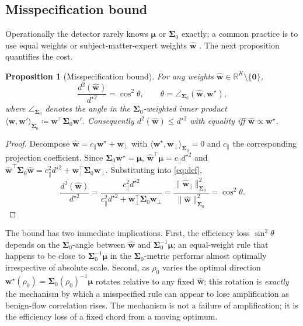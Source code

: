 \documentclass[11pt,a4paper]{article}
\newtheorem{proposition}[theorem]{Proposition}
\theoremstyle{definition}
\theoremstyle{remark}
\newcommand{\R}{\mathbb{R}}
\newcommand{\1}{\mathbf{1}}
\newcommand{\w}{\mathbf{w}}
\newcommand{\mmu}{\boldsymbol{\mu}}
\newcommand{\Sig}{\boldsymbol{\Sigma}}
\newcommand{\trans}{^{\!\top}}
\newcommand{\defeq}{\coloneqq}
\begin{document}
\subsection{Misspecification bound}
Operationally the detector rarely knows $\mmu$ or $\Sig_0$ exactly; a common practice is to use equal weights or subject-matter-expert weights $\widehat{\w}$ \citep{putnins2012market}. The next proposition quantifies the cost.

\begin{proposition}[Misspecification bound]
\label{prop:misspec}
For any weights $\widehat{\w}\in\R^K\setminus\{\mathbf{0}\}$,
\begin{equation}
\frac{d^2(\widehat{\w})}{d^{\star 2}} = \cos^2\theta,\qquad \theta = \angle_{\Sig_0}\!\left(\widehat{\w},\w^\star\right),
\label{eq:misspec}
\end{equation}
where $\angle_{\Sig_0}$ denotes the angle in the $\Sig_0$-weighted inner product $\langle\w,\w'\rangle_{\Sig_0}\defeq\w\trans\Sig_0\w'$. Consequently $d^2(\widehat{\w})\le d^{\star 2}$ with equality iff $\widehat{\w}\propto\w^\star$.
\end{proposition}

\begin{proof}
Decompose $\widehat{\w}=c_\parallel\w^\star + \w_\perp$ with $\langle\w^\star,\w_\perp\rangle_{\Sig_0}=0$ and $c_\parallel$ the corresponding projection coefficient. Since $\Sig_0\w^\star=\mmu$, $\widehat{\w}\trans\mmu = c_\parallel d^{\star 2}$ and $\widehat{\w}\trans\Sig_0\widehat{\w}=c_\parallel^2 d^{\star 2}+\w_\perp\trans\Sig_0\w_\perp$. Substituting into \eqref{eq:def},
\[
\frac{d^2(\widehat{\w})}{d^{\star 2}} = \frac{c_\parallel^2 d^{\star 2}}{c_\parallel^2 d^{\star 2} + \w_\perp\trans\Sig_0\w_\perp}=\frac{\|\widehat{\w}_\parallel\|_{\Sig_0}^2}{\|\widehat{\w}\|_{\Sig_0}^2}=\cos^2\theta.
\]
\end{proof}

The bound has two immediate implications. First, the efficiency loss $\sin^2\theta$ depends on the $\Sig_0$-angle between $\widehat{\w}$ and $\Sig_0^{-1}\mmu$; an equal-weight rule that happens to be close to $\Sig_0^{-1}\mmu$ in the $\Sig_0$-metric performs almost optimally irrespective of absolute scale. Second, as $\rho_0$ varies the optimal direction $\w^\star(\rho_0)=\Sig_0(\rho_0)^{-1}\mmu$ rotates relative to any fixed $\widehat{\w}$; this rotation is \emph{exactly} the mechanism by which a misspecified rule can appear to lose amplification as benign-flow correlation rises. The mechanism is not a failure of amplification; it is the efficiency loss of a fixed chord from a moving optimum.
\end{document}
